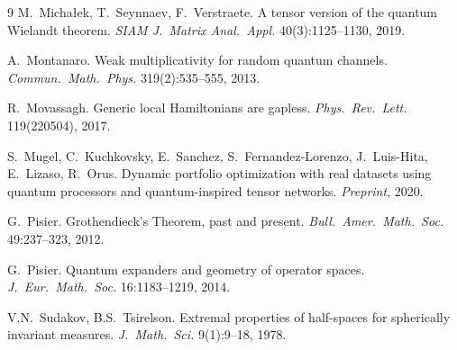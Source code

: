 \documentclass{amsart}
\begin{document}
\begin{thebibliography}{9}
     M.~Micha\l{}ek, T.~Seynnaev, F.~Verstraete. A tensor version of the quantum Wielandt theorem. \textit{SIAM J.~Matrix Anal.~Appl.} 40(3):1125--1130, 2019.

     A.~Montanaro. Weak multiplicativity for random quantum channels. \textit{Commun.~Math.~Phys.} 319(2):535--555, 2013.

     R.~Movassagh. Generic local Hamiltonians are gapless. \textit{Phys.~Rev.~Lett.} 119(220504), 2017.

     S.~Mugel, C.~Kuchkovsky, E.~Sanchez, S.~Fernandez-Lorenzo, J.~Luis-Hita, E.~Lizaso, R.~Orus. Dynamic portfolio optimization with real datasets using quantum processors and quantum-inspired tensor networks. \textit{Preprint}, 2020.

     G.~Pisier. Grothendieck's Theorem, past and present. \textit{Bull.~Amer.~Math.~Soc.} 49:237--323, 2012.

     G.~Pisier. Quantum expanders and geometry of operator spaces. \textit{J.~Eur.~Math.~Soc.} 16:1183--1219, 2014.


     V.N.~Sudakov,  B.S.~Tsirelson. Extremal properties of half-spaces for spherically invariant measures. \textit{J.~Math.~Sci.} 9(1):9--18, 1978.


\end{thebibliography}
\end{document}
